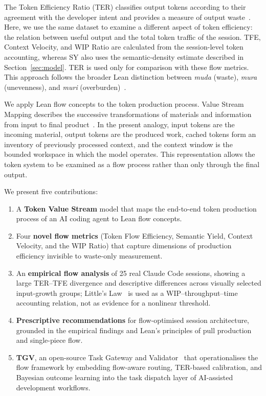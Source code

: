 \documentclass[journal]{IEEEtran}
\begin{document}
The Token Efficiency Ratio (TER) classifies output tokens according to their agreement with the developer intent and provides a measure of output waste~\cite{griffin2026ter}. Here, we use the same dataset to examine a different aspect of token efficiency: the relation between useful output and the total token traffic of the session. TFE, Context Velocity, and WIP Ratio are calculated from the session-level token accounting, whereas SY also uses the semantic-density estimate described in Section~\ref{sec:model}. TER is used only for comparison with these flow metrics. This approach follows the broader Lean distinction between \emph{muda} (waste), \emph{mura} (unevenness), and \emph{muri} (overburden)~\cite{ohno1988}.

We apply Lean flow concepts to the token production process. Value Stream Mapping describes the successive transformations of materials and information from input to final product~\cite{rother1999}. In the present analogy, input tokens are the incoming material, output tokens are the produced work, cached tokens form an inventory of previously processed context, and the context window is the bounded workspace in which the model operates. This representation allows the token system to be examined as a flow process rather than only through the final output.

We present five contributions:

\begin{enumerate}[leftmargin=*, nosep]
  \item A \textbf{Token Value Stream} model that maps the end-to-end token production process of an AI coding agent to Lean flow concepts.
  \item Four \textbf{novel flow metrics} (Token Flow Efficiency, Semantic Yield, Context Velocity, and the WIP Ratio) that capture dimensions of production efficiency invisible to waste-only measurement.
  \item An \textbf{empirical flow analysis} of 25 real Claude Code sessions, showing a large TER--TFE divergence and descriptive differences across visually selected input-growth groups; Little's Law~\cite{little1961} is used as a WIP--throughput--time accounting relation, not as evidence for a nonlinear threshold.
  \item \textbf{Prescriptive recommendations} for flow-optimised session architecture, grounded in the empirical findings and Lean's principles of pull production and single-piece flow.
  \item \textbf{TGV}, an open-source Task Gateway and Validator~\cite{griffin2026tgv} that operationalises the flow framework by embedding flow-aware routing, TER-based calibration, and Bayesian outcome learning into the task dispatch layer of AI-assisted development workflows.
\end{enumerate}
\end{document}
